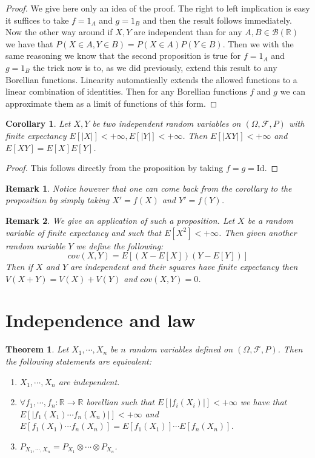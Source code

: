 \documentclass[10pt,a4paper]{book}
\newtheorem{theorem}{Theorem}[section]
\newtheorem{corollary}{Corollary}[theorem]
\newtheorem*{remark}{Remark}
\theoremstyle{definition}
\begin{document}
\begin{proof}
We give here only an idea of the proof. The right to left implication is easy it suffices to take $f = 1_A$ and $g = 1_B$ and then the result follows immediately. Now the other way around if $X, Y$ are independent than for any $A, B \in \mathcal{B}(\mathbb{R})$ we have that $P(X \in A, Y \in B) = P(X \in A) P(Y \in B)$. Then we with the same reasoning we know that the second proposition is true for $f=  1_A$ and $g = 1_B$ the trick now is to, as we did previously, extend this result to any Borellian functions. Linearity automatically extends the allowed functions to a linear combination of identities. Then for any Borellian functions $f$ and $g$ we can approximate them as a limit of functions of this form.  
\end{proof}

\begin{corollary}
Let $X, Y$ be two independent random variables on $(\Omega, \mathcal{F}, P)$ with finite expectancy $E[|X|] < +\infty, E[|Y|] < +\infty$. Then $E[|XY|] < + \infty$ and $E[XY] = E[X]E[Y]$. 
\end{corollary}

\begin{proof}
This follows directly from the proposition by taking $f = g = \text{Id}$. 
\end{proof}

\begin{remark}
Notice however that one can come back from the corollary to the proposition by simply taking $X' = f(X)$ and $Y' = f(Y)$. 
\end{remark}

\begin{remark} We give an application of such a proposition. Let $X$ be a random variable of finite expectancy and such that $E[X^2] < +\infty$. Then given another random variable $Y$ we define the following:
\[
cov(X, Y) = E[( X - E[X]) (Y - E[Y])]
\]
Then if $X$ and $Y$ are independent and their squares have finite expectancy then $V(X + Y) = V(X) + V(Y)$ and $cov(X, Y) = 0$. 
\end{remark}

\section{Independence and law}
\begin{theorem}
Let $X_1, \cdots, X_n$ be $n$ random variables defined on $(\Omega, \mathcal{F}, P)$. Then the following statements are equivalent:
\begin{enumerate}
\item $X_1, \cdots, X_n$ are independent.
\item $\forall f_1, \cdots, f_n : \mathbb{R} \to \mathbb{R}$ borellian such that $E[|f_{i}(X_i)|] < +\infty$ we have that $E[|f_1(X_1) \cdots f_n(X_n)|] < +\infty$ and $E[f_1(X_1) \cdots f_n(X_n)] = E[f_1(X_1)] \cdots E[f_n(X_n)]$. 
\item $P_{X_1, \cdots, X_n} = P_{X_1} \otimes \cdots \otimes P_{X_n}$.
\end{enumerate}
\end{theorem}
\end{document}
